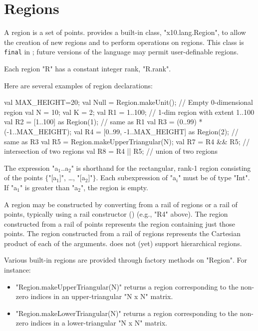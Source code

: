 \section{Regions}\label{XtenRegions}

A region is a set of points.  {}\Xten{}
provides a built-in class, \xcd"x10.lang.Region", to allow the
creation of new regions and to perform operations on regions. This
class is {\tt final} in {}\XtenCurrVer; future versions of the
language may permit user-definable regions.

Each region \xcd"R" has a constant integer rank, \xcd"R.rank".

Here are several examples of region declarations:
\begin{xten}
val MAX_HEIGHT=20;
val Null = Region.makeUnit();  // Empty 0-dimensional region          
val N = 10;
val K = 2;
val R1 = 1..100; // 1-dim region with extent 1..100
val R2 = [1..100] as Region(1); // same as R1
val R3 = (0..99) * (-1..MAX_HEIGHT);   
val R4 = [0..99, -1..MAX_HEIGHT] as Region(2); // same as R3  
val R5 = Region.makeUpperTriangular(N);
val R7 = R4 && R5; // intersection of two regions
val R8 = R4 || R5; // union of two regions
\end{xten}

The expression \xcdmath"a$_1$..a$_2$"
is shorthand for the rectangular, rank-1 region
consisting of the points
$\{$\xcdmath"[a$_1$]", \dots, \xcdmath"[a$_2$]"$\}$.
Each subexpression of \xcdmath"a$_i$" must be of type \xcd"Int".
If \xcdmath"a$_1$"
is greater than \xcdmath"a$_2$", the region is empty.

A region may be constructed by converting from a rail of
regions or a rail of points, typically using a rail constructor
()
(e.g., \xcd"R4" above).
The region constructed from a rail of points represents the
region containing just those points.
The region constructed from a rail of regions
represents
the Cartesian product of each of the arguments.
\XtenCurrVer{} does not (yet) support hierarchical regions.


Various built-in regions are provided through  factory
methods on \xcd"Region".  For instance:
\begin{itemize}
\item \xcd"Region.makeUpperTriangular(N)" returns a region corresponding
to the non-zero indices in an upper-triangular \xcd"N x N" matrix.
\item \xcd"Region.makeLowerTriangular(N)" returns a region corresponding
to the non-zero indices in a lower-triangular \xcd"N x N" matrix.
\end{itemize}

